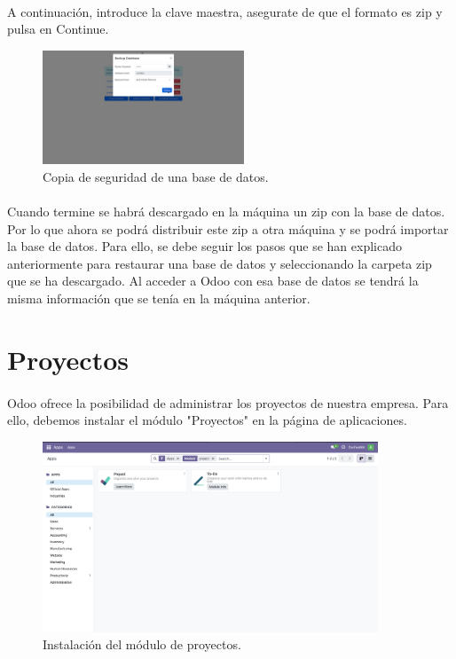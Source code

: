 \documentclass[paper=a4wide, fontsize=11pt]{report}	 %
\begin{document}
\paragraph{}
A continuación, introduce la clave maestra, asegurate de que el formato es zip y pulsa en Continue.
\begin{figure}[h]
    \centering
    \includegraphics[width=6cm]{backupDb2.png}
    \caption{Copia de seguridad de una base de datos.}
    \label{fig:faqs}
\end{figure}
\paragraph{}
Cuando termine se habrá descargado en la máquina un zip con la base de datos. Por lo que ahora se podrá distribuir este zip a otra máquina y se podrá importar la base de datos. Para ello, se debe seguir los pasos que se han explicado anteriormente para restaurar una base de datos y seleccionando la carpeta zip que se ha descargado.
Al acceder a Odoo con esa base de datos se tendrá la misma información que se tenía en la máquina anterior.
\newpage
\section{Proyectos}
\paragraph{}
Odoo ofrece la posibilidad de administrar los proyectos de nuestra empresa. Para ello, debemos instalar el módulo "Proyectos" en la página de aplicaciones.
\begin{figure}[h]
    \centering
    \includegraphics[width=10cm]{searchProject.png}
    \caption{Instalación del módulo de proyectos.}
    \label{fig:installProyectos}
\end{figure}
\end{document}
